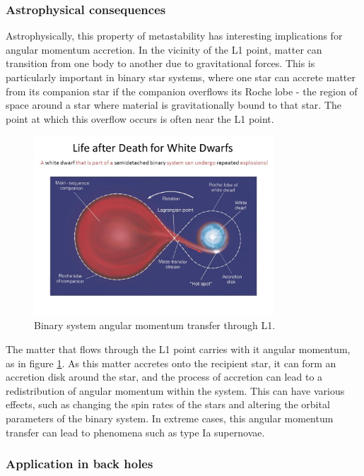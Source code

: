 \documentclass{article}
\begin{document}
\subsubsection{Astrophysical consequences}

Astrophysically, this property of metastability has interesting implications for angular momentum accretion. In the vicinity of the L1 point, matter can transition from one body to another due to gravitational forces. This is particularly important in binary star systems, where one star can accrete matter from its companion star if the companion overflows its Roche lobe - the region of space around a star where material is gravitationally bound to that star. The point at which this overflow occurs is often near the L1 point.

\begin{figure}
    \centering
    \includegraphics[width=0.8\textwidth]{images/Life+after+Death+for+White+Dwarfs.jpg}
    \caption{Binary system angular momentum transfer through L1.}
    \label{fig:Binary star system L1}
\end{figure}

The matter that flows through the L1 point carries with it angular momentum, as in figure \ref{fig:Binary star system L1}. As this matter accretes onto the recipient star, it can form an accretion disk around the star, and the process of accretion can lead to a redistribution of angular momentum within the system. This can have various effects, such as changing the spin rates of the stars and altering the orbital parameters of the binary system. In extreme cases, this angular momentum transfer can lead to phenomena such as type Ia supernovae.


\subsubsection{Application in back holes}
\end{document}
